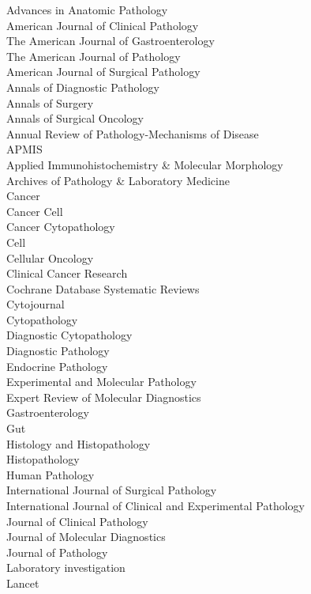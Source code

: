 \documentclass[]{article}
\begin{document}
Advances in Anatomic Pathology\\
American Journal of Clinical Pathology\\
The American Journal of Gastroenterology\\
The American Journal of Pathology\\
American Journal of Surgical Pathology\\
Annals of Diagnostic Pathology\\
Annals of Surgery\\
Annals of Surgical Oncology\\
Annual Review of Pathology-Mechanisms of Disease\\
APMIS\\
Applied Immunohistochemistry \& Molecular Morphology\\
Archives of Pathology \& Laboratory Medicine\\
Cancer\\
Cancer Cell\\
Cancer Cytopathology\\
Cell\\
Cellular Oncology\\
Clinical Cancer Research\\
Cochrane Database Systematic Reviews\\
Cytojournal\\
Cytopathology\\
Diagnostic Cytopathology\\
Diagnostic Pathology\\
Endocrine Pathology\\
Experimental and Molecular Pathology\\
Expert Review of Molecular Diagnostics\\
Gastroenterology\\
Gut\\
Histology and Histopathology\\
Histopathology\\
Human Pathology\\
International Journal of Surgical Pathology\\
International Journal of Clinical and Experimental Pathology\\
Journal of Clinical Pathology\\
Journal of Molecular Diagnostics\\
Journal of Pathology\\
Laboratory investigation\\
Lancet\\
\end{document}

